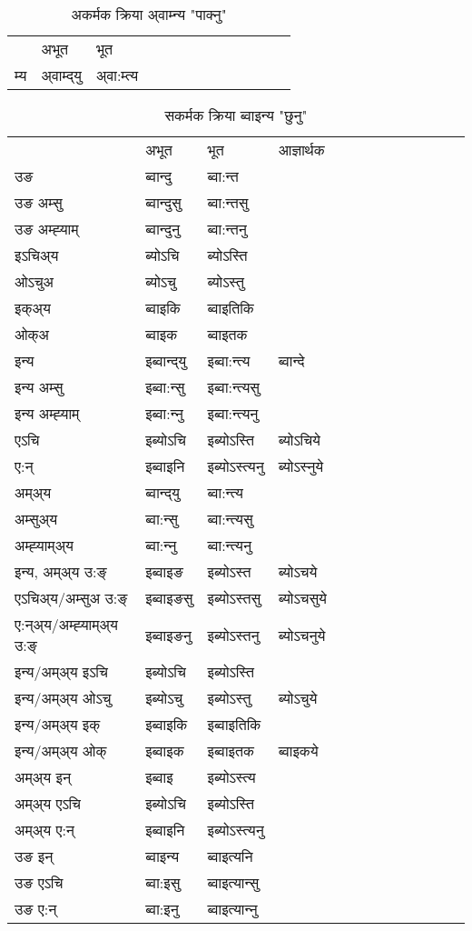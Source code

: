 \begin{table}[H]
\label{omt.vt} \centering
\caption{अकर्मक क्रिया  अ्वाम्‍न्य  "पाक्नु"  }
\begin{tabular}{l|l|l|l|l|l|l|l|l|l|l|l|l}  \toprule
&अभूत & भूत   \\ 
म्य & अ्वाम्द्‌यु  & अ्वा:म्त्य  \\ 
\bottomrule
\end{tabular}
\end{table}


\begin{table}[H]
\label{ont.vt} \centering
\caption{सकर्मक क्रिया  ब्वाइन्य  "छुनु"  }
\begin{tabular}{l|l|l|l|l|l|l|l|l|l|l|l|l}  \toprule
&अभूत & भूत & आज्ञार्थक \\ 
उङ &ब्वान्दु &ब्वा:न्त \\ 
उङ अम्सु&ब्वान्दुसु &ब्वा:न्तसु \\ 
उङ अम्ह्‍याम्&ब्वान्दुनु &ब्वा:न्तनु \\ 
इऽचिअ्य &ब्योऽचि &ब्योऽस्ति   \\ 
ओऽचुअ        &ब्योऽचु &ब्योऽस्तु   \\ 
इक्अ्य&ब्वाइकि &ब्वाइतिकि   \\ 
ओक्अ &ब्वाइक &ब्वाइतक   \\ 
इन्य & इब्वान्द्‌यु  & इब्वा:न्त्य &ब्वान्दे  \\ 
इन्य अम्सु& इब्वा:न्सु  & इब्वा:न्त्यसु   \\ 
इन्य अम्ह्‍याम्& इब्वा:न्‍नु  & इब्वा:न्त्यनु   \\ 
एऽचि & इब्योऽचि & इब्योऽस्ति &ब्योऽचिये    \\ 
ए:न् & इब्वाइनि  & इब्योऽस्त्यनु &ब्योऽस्‍नुये  \\ 
अम्अ्य & ब्वान्द्‌यु  & ब्वा:न्त्य  \\ 
अम्सुअ्य & ब्वा:न्सु & ब्वा:न्त्यसु  \\ 
अम्ह्‍याम्अ्य & ब्वा:न्‍नु  & ब्वा:न्त्यनु \\ 
\midrule
इन्य, अम्अ्य उ:ङ्‌ &इब्वाइङ &इब्योऽस्त &ब्योऽचये \\ 
एऽचिअ्य/अम्सुअ उ:ङ्‌ &इब्वाइङसु &इब्योऽस्तसु &ब्योऽचसुये \\ 
ए:न्अ्य/अम्ह्‍याम्अ्य उ:ङ्‌ &इब्वाइङनु &इब्योऽस्तनु &ब्योऽचनुये \\ 
इन्य/अम्अ्य इऽचि &इब्योऽचि &इब्योऽस्ति    \\ 
इन्य/अम्अ्य ओऽचु &इब्योऽचु &इब्योऽस्तु  &ब्योऽचुये  \\ 
इन्य/अम्अ्य इक् &इब्वाइकि &इब्वाइतिकि   \\ 
इन्य/अम्अ्य ओक् &इब्वाइक &इब्वाइतक  &ब्वाइकये  \\ 
अम्अ्य इन् & इब्वाइ & इब्योऽस्त्य   \\ 
अम्अ्य एऽचि & इब्योऽचि & इब्योऽस्ति    \\ 
अम्अ्य ए:न् & इब्वाइनि  & इब्योऽस्त्यनु  \\ 
\midrule
उङ इन् & ब्वाइन्य  & ब्वाइत्यनि  \\ 
उङ एऽचि & ब्वा:इसु  & ब्वाइत्यान्सु   \\ 
उङ ए:न्& ब्वा:इनु  & ब्वाइत्यान्‍नु   \\ 
\bottomrule
\end{tabular}
\end{table}


